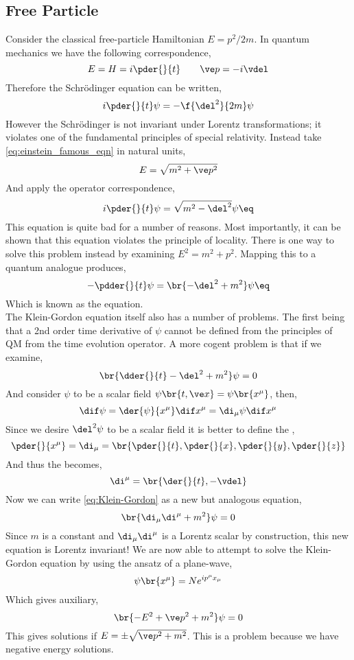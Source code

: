 \documentclass{article}
\begin{document}
\subsection{Free Particle}
Consider the classical free-particle Hamiltonian $E = p^2 / 2m$. In quantum mechanics we have the following correspondence,
\[ E = H = i \pder{}{t} \qquad \ve p = - i \vdel \]
Therefore the Schrödinger equation can be written,
\[ i \pder{}{t} \psi = - \f{\del^2}{2m} \psi  \]
However the Schrödinger is not invariant under Lorentz transformations; it violates one of the fundamental principles of special relativity. Instead take \cref{eq:einstein_famous_eqn} in natural units,
\[ E = \sqrt{m^2 + \ve p^2} \]
And apply the operator correspondence,
\[ i \pder{}{t} \psi = \sqrt{m^2 - \del^2} \psi \eq \label{eq:bad}\]
This equation is quite bad for a number of reasons. Most importantly, it can be shown that this equation violates the principle of locality. There is one way to solve this problem instead by examining $E^2 = m^2 + p^2$. Mapping this to a quantum analogue produces,
\[ -\pdder{}{t} \psi = \br{-\del^2 + m^2} \psi \eq \label{eq:Klein-Gordon} \]
Which is known as the  equation.\\

The Klein-Gordon equation itself also has a number of problems. The first being that a 2nd order time derivative of $\psi$ cannot be defined from the principles of QM from the time evolution operator. A more cogent problem is that if we examine,
\[ \br{\dder{}{t} - \del^2 + m^2} \psi = 0 \]
And consider $\psi$ to be a scalar field $\psi\br{t, \ve x} = \psi\br{x^{\mu}}$, then,
\[ \dif \psi = \der{\psi}{x^{\mu}} \dif x^{\mu} = \di_{\mu} \psi \dif x^{\mu} \]
Since we desire $\del^2 \psi$ to be a scalar field it is better to define the ,
\[ \pder{}{x^{\mu}} = \di_{\mu} = \br{\pder{}{t}, \pder{}{x}, \pder{}{y}, \pder{}{z}} \]
And thus the  becomes,
\[ \di^{\mu} = \br{\der{}{t}, - \vdel } \]
Now we can write \cref{eq:Klein-Gordon} as a new but analogous equation,
\[ \br{\di_{\mu} \di^{\mu} + m^2} \psi = 0 \]
Since $m$ is a constant and $\di_{\mu} \di^{\mu}$ is a Lorentz scalar by construction, this new equation is Lorentz invariant!
We are now able to attempt to solve the Klein-Gordon equation by using the ansatz of a plane-wave,
\[ \psi\br{x^{\mu}} = N e^{i p^{\mu} x_{\mu}} \]
Which gives auxiliary,
\[ \br{- E^2 + \ve p^2 + m^2}\psi = 0 \]
This gives solutions if $E = \pm \sqrt{\ve p^2 + m^2}$. This is a problem because we have negative energy solutions.\\
\end{document}
